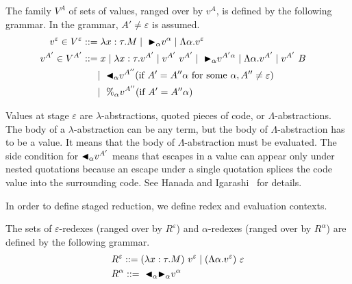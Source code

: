 \begin{definition}[Values]
    The family $V^A$ of sets of values, ranged over by $v^A$,
    is defined by the following grammar.  In the grammar, $A' \neq \varepsilon$ is assumed.
    \begin{align*}
        v^\varepsilon \in V^\varepsilon & ::= \lambda x:\tau.M \mid\ {\mathop{\blacktriangleright}}_\alpha v^\alpha \mid \Lambda\alpha.v^\varepsilon                                             & \\
        v^{A'} \in V^{A'}               & ::= x \mid \lambda x:\tau.v^{A'} \mid v^{A'}\ v^{A'} \mid\ {\mathop{\blacktriangleright}}_\alpha v^{A'\alpha} \mid \Lambda\alpha.v^{A'} \mid v^{A'}\ B & \\
        & \quad\   \mid\ {\mathop{\blacktriangleleft}}_\alpha v^{A''} (\text{if } A' = A''\alpha \text{ for some } \alpha, A'' \neq \varepsilon)               & \\
        & \quad\   \mid\ \%_\alpha v^{A''} (\text{if } A' = A''\alpha)
    \end{align*}
\end{definition}

Values at stage $\varepsilon$ are $\lambda$-abstractions, quoted pieces of
code, or $\Lambda$-abstractions. The body of a $\lambda$-abstraction can be any
term, but the body of $\Lambda$-abstraction has to be a value.  It means that
the body of $\Lambda$-abstraction must be evaluated.  The side condition for
${\mathop{\blacktriangleleft}}_\alpha v^{A'}$ means that escapes in a value can appear only under nested
quotations because an escape under a single quotation splices the code value
into the surrounding code. See Hanada and Igarashi~\cite{HanadaIgarashi2014CSP} for
details.

In order to define staged reduction, we define redex and evaluation contexts.

\begin{definition}[Redex]
    The sets of $\varepsilon$-redexes (ranged over by $R^\varepsilon$) and $\alpha$-redexes (ranged over by $R^\alpha$) are defined by the following grammar.
    \begin{align*}
        & R^\varepsilon ::= (\lambda x:\tau.M)\ v^\varepsilon \mid (\Lambda\alpha.v^\varepsilon)\ \varepsilon \\
        & R^\alpha      ::=\ {\mathop{\blacktriangleleft}}_\alpha {\mathop{\blacktriangleright}}_\alpha v^\alpha                                                         \\
    \end{align*}
\end{definition}

